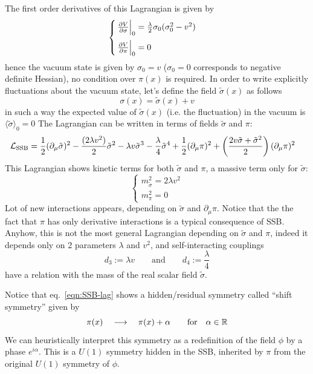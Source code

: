 \documentclass[TheoreticalPhy_ModB.tex]{subfiles}
\begin{document}
The first order derivatives of this Lagrangian is given by
\[\begin{cases}
\frac{\partial V}{\partial\sigma}\Big\vert_0=\frac\lambda2\sigma_0(\sigma_0^2-v^2)\vspace{2mm}\\
\frac{\partial V}{\partial\pi}\Big\vert_0=0
\end{cases}\]
hence the vacuum state is given by $\sigma_0=v$ ($\sigma_0=0$ corresponds to negative definite Hessian), no condition over $\pi(x)$ is required.
In order to write explicitly fluctuations about the vacuum state, let's define the field $\tilde \sigma(x)$ as follows
\[\sigma(x)=\tilde\sigma(x)+v\]
in such a way the expected value of $\tilde\sigma(x)$ (i.e. the fluctuation) in the vacuum is $\langle\tilde\sigma\rangle_0=0$
The Lagrangian can be written in terms of fields $\tilde\sigma$ and $\pi$:
\begin{equation}\label{eqn:SSB-lag}\begin{split}
\mathcal L_{\text{SSB}}&=
\frac12(\partial_\mu\tilde\sigma)^2-\frac{(2\lambda v^2)}2\tilde\sigma^2-\lambda v\tilde\sigma^3-\frac\lambda4\tilde\sigma^4+\frac12(\partial_\mu\pi)^2+\left(\frac{2v\tilde\sigma+\tilde\sigma^2}2\right)(\partial_\mu\pi)^2
\end{split}\end{equation}
This Lagrangian shows kinetic terms for both $\tilde \sigma$ and $\pi$, a massive term only for $\tilde\sigma$:
\[\begin{cases}
m_{\tilde\sigma}^2=2\lambda v^2\\
m_\pi^2=0
\end{cases}\]
Lot of new interactions appears, depending on $\tilde\sigma$ and $\partial_\mu\pi$. Notice that the the fact that $\pi$ has only derivative interactions is a typical consequence of SSB. Anyhow, this is not the most general Lagrangian depending on $\tilde\sigma$ and $\pi$, indeed it depends only on 2 parameters $\lambda$ and $v^2$, and self-interacting couplings 
\[d_3:=\lambda v\qquad\text{and}\qquad d_4:=\frac\lambda4\]
have a relation with the mass of the real scalar field $\tilde\sigma$. 

Notice that eq.~\eqref{eqn:SSB-lag} shows a hidden/residual symmetry called ``shift symmetry'' given by
\[\pi(x)\quad\longrightarrow\quad\pi(x)+\alpha\qquad\text{for}\quad\alpha\in\mathbb{R}\]
We can heuristically interpret this symmetry as a redefinition of the field $\phi$ by a phase $e^{i\alpha}$. This is a $U(1)$ symmetry hidden in the SSB, inherited by $\pi$ from the original $U(1)$ symmetry of $\phi$. 
\end{document}
